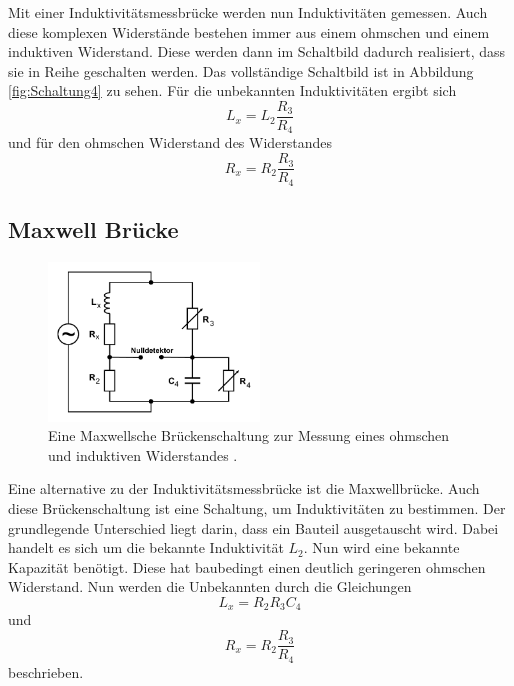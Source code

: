 Mit einer Induktivitätsmessbrücke werden nun Induktivitäten gemessen.
Auch diese komplexen Widerstände bestehen immer aus einem ohmschen und einem induktiven Widerstand.
Diese werden dann im Schaltbild dadurch realisiert, dass sie in Reihe geschalten werden.
Das vollständige Schaltbild ist in Abbildung \ref{fig:Schaltung4} zu sehen.
Für die unbekannten Induktivitäten ergibt sich
\begin{equation} \label{eq:L_x}
    L_x = L_2 \frac{R_3}{R_4}
\end{equation}
und für den ohmschen Widerstand des Widerstandes
\begin{equation} \label{eq:induktR_x}
    R_x = R_2 \frac{R_3}{R_4}
\end{equation}

\subsection{Maxwell Brücke}
\begin{figure}
    \centering
    \includegraphics[width=0.5\textwidth]{pictures/schaltung5.pdf}
    \caption{Eine Maxwellsche Brückenschaltung zur Messung eines ohmschen und induktiven Widerstandes \cite[7]{v302}.}
    \label{fig:Schaltung5}
\end{figure}

Eine alternative zu der Induktivitätsmessbrücke ist die Maxwellbrücke.
Auch diese Brückenschaltung ist eine Schaltung, um Induktivitäten zu bestimmen.
Der grundlegende Unterschied liegt darin, dass ein Bauteil ausgetauscht wird.
Dabei handelt es sich um die bekannte Induktivität $L_2$.
Nun wird eine bekannte Kapazität benötigt.
Diese hat baubedingt einen deutlich geringeren ohmschen Widerstand.
Nun werden die Unbekannten durch die Gleichungen
\begin{equation} \label{eq:maxwL_x}
    L_x = R_2 R_3 C_4
\end{equation}
und 
\begin{equation} \label{eq:maxwR_x}
    R_x = R_2 \frac{R_3}{R_4}
\end{equation}
beschrieben.

